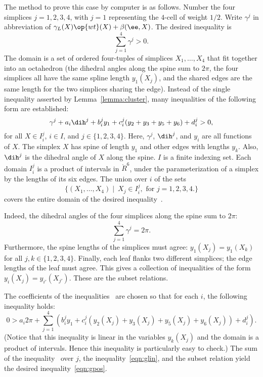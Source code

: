{The method to prove this case by computer is as follows.  Number the
four simplices $j=1,2,3,4$, with $j=1$ representing the $4$-cell of
weight $1/2$.  Write $\gamma^j$ in abbreviation of
$\gamma_L(X)\op{wt}(X) + \beta(\ee,X)$.  The desired inequality is
\begin{equation}\label{eqn:gpos} 
\sum_{j=1}^4 \gamma^j > 0.
\end{equation}
The domain is a set of ordered four-tuples of simplices
$X_1,\ldots,X_4$ that fit together into an octahedron (the dihedral
angles along the spine sum to $2\pi$, the four simplices all have the
same spline length $y_1(X_j)$, and the shared edges are the same
length for the two simplices sharing the edge).  Instead of the single
inequality asserted by Lemma~\ref{lemma:cluster}, many inequalities of
the following form are established:
\begin{equation}\label{eqn:gpart} 
\gamma^j + a_i \dih^j + b_i^j y_1 + c_i^j (y_2+y_3+y_5+y_6) + d_i^j > 0, 
\end{equation}
for all $X \in I_i^j$, \quad $i \in I$, and $j\in \{1,2,3,4\}$.  Here,
$\gamma^j$, $\dih^j$, and $y_i$ are all functions of $X$.  The simplex
$X$ has spine of length $y_1$ and other edges with lengths $y_k$.
Also, $\dih^j$ is the dihedral angle of $X$ along the spine.  $I$ is a
finite indexing set.  Each domain $I_i^j$ is a product of intervals in
$\ring{R}^6$, under the parameterization of a simplex by the lengths
of its six edges.  The union over $i$ of the sets
\begin{displaymath} 
\{(X_1,\ldots,X_4)\mid~ X_j \in I_i^j,\text{ for } j=1,2,3,4.\}
\end{displaymath}
covers the entire domain of the desired inequality~.   

  Indeed, the
dihedral angles of the four simplices along the spine sum to $2\pi$:
\begin{displaymath} 
\sum_{j=1}^4 \gamma^j = 2\pi.
\end{displaymath}
Furthermore, the spine lengths of the simplices must agree: $y_1(X_j)
= y_1(X_k)$ for all $j,k\in\{1,2,3,4\}$.  Finally, each leaf flanks
two different simplices; the edge lengths of the leaf must agree.
This gives a collection of inequalities of the form $y_i(X_j) =
y_{i'}(X_{j'})$.  These are the subset relations.

The coefficients of the inequalities~
are chosen so that for each $i$, the following inequality holds:
\begin{equation}\label{eqn:glin} 
0 > a_i 2\pi + 
\sum_{j=1}^4 (b_i^j y_1 +  c_i^j (y_2(X_j)+y_3(X_j)+y_5(X_j)+y_6(X_j)) + d_i^j).
\end{equation}
(Notice that this inequality is linear in the variables $y_k(X_j)$ and
the domain is a product of intervals.  Hence this inequality is
particularly easy to check.)  The sum of the
inequality~ over $j$, the inequality~\ref{eqn:glin},
and the subset relation yield the desired inequality~\ref{eqn:gpos}.

}
